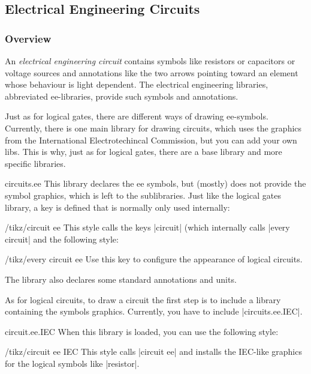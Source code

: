 \subsection{Electrical Engineering Circuits}

\subsubsection{Overview}

An \emph{electrical engineering circuit} contains symbols like
resistors or capacitors or voltage sources and annotations like the
two arrows pointing toward an element whose behaviour is light
dependent. The electrical engineering libraries, abbreviated
ee-libraries, provide such symbols and annotations.

Just as for logical gates, there are different ways of drawing
ee-symbols. Currently, there is one main library for drawing circuits,
which uses the graphics from the International Electrotechincal
Commission, but you can add your own libs. This is why, just as for
logical gates, there are a base library and more specific libraries.

\begin{tikzlibrary}{circuits.ee}
  This library declares the ee symbols, but (mostly) does not 
  provide the symbol graphics, which is left to the sublibraries.
  Just like the logical gates library, a key is defined that is
  normally only used internally:
  \begin{key}{/tikz/circuit ee}
    This style calls the keys |circuit| (which internally calls
    |every circuit| and the following style:
    \begin{stylekey}{/tikz/every circuit ee}
      Use this key to configure the appearance of logical circuits.      
    \end{stylekey}
  \end{key}

  The library also declares some standard annotations and units. 
\end{tikzlibrary}

As for logical circuits, to draw a circuit the first step is to
include a library containing the symbols graphics. Currently, you have to
include |circuits.ee.IEC|.

\begin{tikzlibrary}{circuit.ee.IEC}
  When this library is loaded, you can use the following style: 
  \begin{key}{/tikz/circuit ee IEC}
    This style calls |circuit ee| and installs the IEC-like
    graphics for the logical symbols like |resistor|.
  \end{key}
\end{tikzlibrary}

